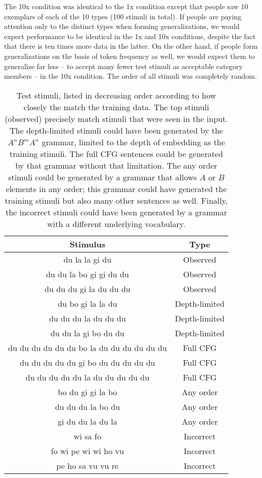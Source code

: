 \documentclass[10pt,letterpaper]{article}
\begin{document}
The {\sc 10x} condition was identical to the {\sc 1x} condition except that people saw 10 exemplars of each of the 10 types (100 stimuli in total). If people are paying attention only to the distinct types when forming generalizations, we would expect performance to be identical in the {\sc 1x} and {\sc 10x} conditions, despite the fact that there is ten times more data in the latter. On the other hand, if people form generalizations on the basis of token frequency as well, we would expect them to generalize far less -- to accept many fewer test stimuli as acceptable category members -- in the {\sc 10x} condition. The order of all stimuli was completely random.

\begin{table}[t]
\begin{center}
\begin{tabular}{|c|c|}
\hline
Stimulus & Type \\
\hline
du la la gi du & Observed \\
du du la bo gi gi du du & Observed \\
du du du gi la du du du & Observed \\
du bo gi la la du & Depth-limited \\
du du du la du du du & Depth-limited \\
du du la gi bo du du & Depth-limited \\
du du du du du du bo la du du du du du du & Full CFG \\
du du du du du gi bo du du du du du & Full CFG \\
du du du du du la du du du du du & Full CFG \\
bo du gi gi la bo & Any order \\
du du du la bo du & Any order \\
gi du du la du la & Any order \\
wi sa fo & Incorrect \\
fo wi pe wi wi ho vu & Incorrect \\
pe ho sa vu vu re & Incorrect\\
\hline
\end{tabular}
\caption{Test stimuli, listed in decreasing order according to how closely the match the training data. The top stimuli ({\sc observed}) precisely match stimuli that were seen in the input. The {\sc depth-limited} stimuli could have been generated by the $A^nB^mA^n$ grammar, limited to the depth of embedding as the training stimuli. The {\sc full CFG} sentences could be generated by that grammar without that limitation. The {\sc any order} stimuli could be generated by a grammar that allows $A$ or $B$ elements in any order; this grammar could have generated the training stimuli but also many other sentences as well. Finally, the {\sc incorrect} stimuli could have been generated by a grammar with a different underlying vocabulary.}
\label{teststimuli}
\end{center}
\end{table}
\end{document}
